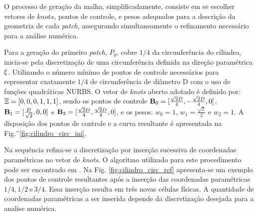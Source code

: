 \documentclass[tese_patricia]{subfiles}
\begin{document}
O processo de geração da malha, simplificadamente, consiste em se escolher vetores de $knots$, pontos de controle, e pesos adequados para a descrição da geometria de cada \textit{patch}, assegurando simultaneamente o refinamento necessário para a análise numérica.

Para a geração do primeiro \textit{patch}, $P_0$, cobre $1/4$ da circunferência do cilindro, inicia-se pela discretização de uma circunferência definida na direção paramétrica $\xi$. Utilizando o número mínimo de pontos de controle necessários para representar exatamente $1/4$ de circunferência de diâmetro D com o uso de funções quadráticas NURBS. O vetor de \textit{knots} aberto adotado é definido por: $\Xi=\left[0,0,0,1,1,1\right]$, sendo os pontos de controle  $\mathbf{B}_0=[\frac{\sqrt{2}D}{4},-\frac{\sqrt{2}D}{4},0]$, $\mathbf{B}_1=[\frac{D}{\sqrt{2}},0,0]$ e $\mathbf{B}_2=[\frac{\sqrt{2}D}{4},\frac{\sqrt{2}D}{4},0]$, e os pesos: $w_0 = 1$, $w_1 = \frac{\sqrt{2}}{2}$ e $w_2 = 1$. A disposição dos pontos de controle e a curva resultante é apresentada na Fig.˜\ref{fig:cilindro_circ_ini}.

Na sequência refina-se a discretização por inserção sucessiva de coordenadas paramétricas no vetor de \textit{knots}. O algoritmo utilizado para este procedimento pode ser encontrado em . Na Fig. \ref{fig:cilindro_circ_ref} apresenta-se um exemplo dos pontos de controle resultantes após a inserção das coordenadas paramétricas $1/4, 1/2 \ \text{e} \ 3/4$. Essa inserção resulta em três novas células físicas. A quantidade de coordenadas paramétricas a ser inserida depende da discretização desejada para a analise numérica.
\end{document}
